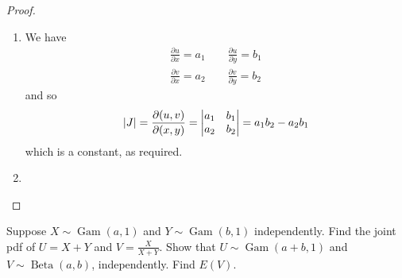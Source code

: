 \documentclass[notoc,notitlepage]{tufte-book}
\DeclareMathOperator{\Gam}{Gam }
\DeclareMathOperator{\BetaDist}{Beta }
\begin{document}
\begin{proof}
  \begin{enumerate}
    \item We have
      \begin{gather*}
        \frac{\partial u}{\partial x} = a_1 \qquad \frac{\partial u}{\partial y} = b_1 \\
        \frac{\partial v}{\partial x} = a_2 \qquad \frac{\partial v}{\partial y} = b_2
      \end{gather*}
      and so
      \begin{equation*}
        \left| J \right| = \frac{\partial (u, v)}{\partial (x, y)} = \begin{vmatrix}
            a_1 & b_1 \\
            a_2 & b_2
        \end{vmatrix} = a_1 b_2 - a_2 b_1
      \end{equation*}
      which is a constant, as required.

    \item {}
  \end{enumerate}
\end{proof}

\begin{eg}
  Suppose $X \sim \Gam(a, 1)$ and $Y \sim \Gam(b, 1)$ independently. Find the joint pdf of $U = X + Y$ and $V = \frac{X}{X + Y}$. Show that $U \sim \Gam(a + b, 1)$ and $V \sim \BetaDist(a, b)$, independently. Find $E(V)$.
\end{eg}
\end{document}
